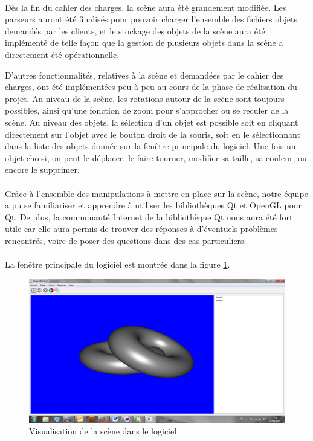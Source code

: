 \paragraph{}
Dès la fin du cahier des charges, la scène aura été grandement modifiée. Les parseurs auront été finalisés pour pouvoir charger l'ensemble des fichiers objets demandés par les clients, et le stockage des objets de la scène aura été implémenté de telle façon que la gestion de plusieurs objets dans la scène a directement été opérationnelle. 

D'autres fonctionnalités, relatives à la scène et demandées par le cahier des charges, ont été implémentées peu à peu au cours de la phase de réalisation du projet. Au niveau de la scène, les rotations autour de la scène sont toujours possibles, ainsi qu'une fonction de zoom pour s'approcher ou se reculer de la scène. Au niveau des objets, la sélection d'un objet est possible soit en cliquant directement sur l'objet avec le bouton droit de la souris, soit en le sélectionnant dans la liste des objets donnée sur la fenêtre principale du logiciel. Une fois un objet choisi, on peut le déplacer, le faire tourner, modifier sa taille, sa couleur, ou encore le supprimer.

\paragraph{}
Grâce à l'ensemble des manipulations à mettre en place sur la scène, notre équipe a pu se familiariser et apprendre à utiliser les bibliothèques Qt et OpenGL pour Qt. De plus, la communauté Internet de la bibliothèque Qt nous aura été fort utile car elle aura permis de trouver des réponses à d'éventuels problèmes rencontrés, voire de poser des questions dans des cas particuliers.

\paragraph{}
La fenêtre principale du logiciel est montrée dans la figure \ref{fig:screenScene}.

\begin{figure}[h]
	\centering
	\includegraphics[scale=0.3]{Scene.png}
	\caption{\label{fig:screenScene} Visualisation de la scène dans le logiciel \protect}
\end{figure}

